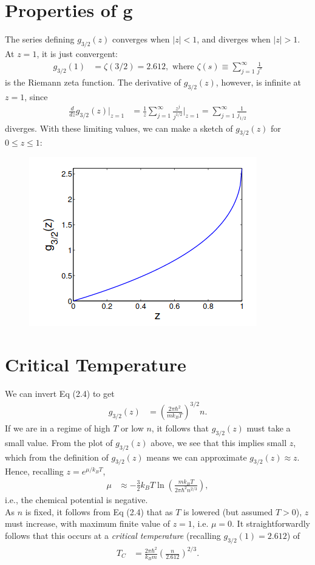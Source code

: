 \documentclass[a4paper, 11pt, normalem]{report}
\begin{document}
\section{Properties of g}
The series defining $g_{3/2}(z)$ converges when $|z|<1$, and diverges when $|z|>1$.
At $z=1$, it is just convergent:
\begin{align}
    g_{3/2}(1) &= \zeta(3/2) = 2.612, \text{ where } \zeta(s) \equiv \sum_{j=1}^\infty \frac{1}{j^s}
\end{align}
is the Riemann zeta function.
The derivative of $g_{3/2}(z)$, however, is infinite at $z=1$, since
\begin{align}
    \frac{d}{dz}g_{3/2}(z)\bigg|_{z=1} &= \frac{1}{z}\sum_{j=1}^\infty \frac{z^j}{j^{1/2}}\bigg|_{z=1} = \sum_{j=1}^\infty \frac{1}{j_{1/2}}
\end{align}
diverges.
With these limiting values, we can make a sketch of $g_{3/2}(z)$ for $0\leq z\leq1$:
\begin{figure}[H]
    \centering
    \includegraphics[scale=0.7]{g32.png}
\end{figure}

\section{Critical Temperature}
We can invert Eq (2.4) to get
\begin{align}
    g_{3/2}(z) &= \left(\frac{2\pi\hbar^2}{mk_BT}\right)^{3/2}n.
\end{align}
If we are in a regime of high $T$ or low $n$, it follows that $g_{3/2}(z)$ must take a small value.
From the plot of $g_{3/2}(z)$ above, we see that this implies small $z$, which from the definition of $g_{3/2}(z)$ means we can approximate $g_{3/2}(z)\approx z$.
Hence, recalling $z=e^{\mu/k_BT}$,
\begin{align}
    \mu &\approx -\frac32 k_BT\ln\left(\frac{mk_BT}{2\pi\hbar^2n^{2/3}}\right),
\end{align}
i.e., the chemical potential is negative. \\
As $n$ is fixed, it follows from Eq (2.4) that as $T$ is lowered (but assumed $T>0$), $z$ must increase, with maximum finite value of $z=1$, i.e. $\mu=0$.
It straightforwardly follows that this occurs at a \emph{critical temperature} (recalling $g_{3/2}(1)=2.612$) of
\begin{align}
    T_C &= \frac{2\pi\hbar^2}{k_Bm}\left(\frac{n}{2.612}\right)^{2/3}.
\end{align}
\end{document}
